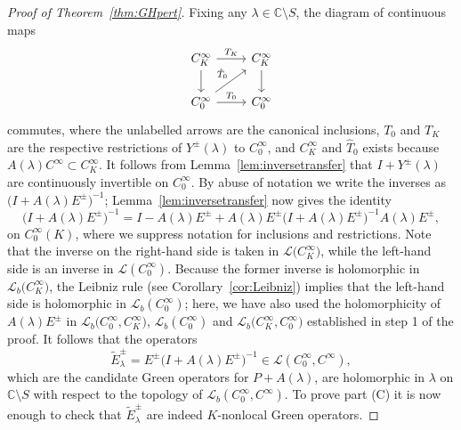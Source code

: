 \documentclass[11pt]{article}
\numberwithin{equation}{section}
\numberwithin{equation}{section}
\newcommand{\CC}{{\mathbb C}}
\newcommand{\LL}{{\mathcal L}}
\begin{document}
\begin{proof}[Proof of Theorem~\ref{thm:GHpert}]
 	Fixing any $\lambda\in \CC\setminus S$, the diagram of continuous maps
 	\begin{equation*}
 		\begin{tikzcd}
 			C^\infty_K \arrow[r, "T_K"]\arrow[d] & C^\infty_K \arrow[d]\\
 			C_0^\infty \arrow[r, "T_0"]\arrow[ur,"\hat{T}_0"] & C_0^\infty
 		\end{tikzcd}
 	\end{equation*}
 	commutes, where the unlabelled arrows are the canonical inclusions,
 	$T_0$ and $T_K$ are the respective restrictions of $Y^\pm(\lambda)$
 	to $C_0^\infty$, and $C_K^\infty$ and $\hat{T}_0$ exists because
 	$A(\lambda)C^\infty\subset C^\infty_K$.
 	It follows from Lemma~\ref{lem:inversetransfer} that $I+ Y^\pm(\lambda)$ are continuously invertible on $C_0^\infty$. By abuse of notation we write the inverses as $\big(I+ A(\lambda)E^\pm\big)^{-1}$; Lemma~\ref{lem:inversetransfer} now gives the identity
 	\begin{equation}\label{eq:inverseidentity}
 		\big(I+ A(\lambda)E^\pm\big)^{-1} = I - A(\lambda)E^\pm + A(\lambda)E^\pm \big(I+ A(\lambda)E^\pm\big)^{-1} A(\lambda)E^\pm,
 	\end{equation}
 	on $C_0^\infty(K)$, where we suppress notation for inclusions and restrictions. Note that the inverse on the right-hand side is taken in $\LL\big(C^\infty_K\big)$, while the left-hand side is an inverse in $\LL(C^\infty_0)$. Because the former inverse is holomorphic in
 	$\LL_b\big(C^\infty_K\big)$, the Leibniz rule (see Corollary~\ref{cor:Leibniz}) implies that the left-hand side is
 	holomorphic in $\LL_b(C_0^\infty)$; here, we have also used the holomorphicity
 	of~$A(\lambda)E^\pm$ in $\LL_b\big(C_0^\infty,C^\infty_K\big)$, $\LL_b(C_0^\infty)$ and $\LL_b\big(C^\infty_K,C_0^\infty\big)$ established in step 1 of the proof. It follows that the operators
 	\begin{equation*}
 		\tilde{E}^\pm_\lambda= E^\pm \big(I+ A(\lambda)E^\pm\big)^{-1}\in\LL(C_0^\infty, C^\infty),
 	\end{equation*}
 	which are the candidate Green operators for $P+A(\lambda)$,	are holomorphic in $\lambda$ on $\CC\setminus S$ with respect to the topology of $\LL_b(C_0^\infty,C^\infty)$.
 	To prove part (C) it is now enough to check that $\tilde{E}^\pm_\lambda$ are indeed $K$-nonlocal Green operators.
 	

\end{proof}
\end{document}
